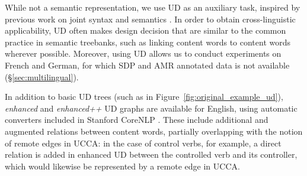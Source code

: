 \documentclass[11pt,a4paper]{article}
\begin{document}
While not a semantic representation,
we use UD as an auxiliary task,
inspired by previous work on joint syntax and semantics
\cite{lluis2008joint,collobert2011natural,D15-1169,swayamdipta-EtAl:2016:CoNLL,swayamdipta2017frame}.
In order to obtain cross-linguistic applicability, 
UD often makes design decision that are similar to the common practice
in semantic treebanks, such as linking content words to content words wherever possible.
Moreover, using UD allows us to conduct experiments on French and German, 
for which SDP and AMR annotated data is not available (\S\ref{sec:multilingual}).

In addition to basic UD trees (such as in Figure~\ref{fig:original_example_ud}),
\textit{enhanced} and \textit{enhanced++} UD graphs are available for English,
using automatic converters included in Stanford CoreNLP \cite{SCHUSTER16.779}.
These include additional and augmented relations between content words,
partially overlapping with the notion of remote edges in UCCA:
in the case of control verbs, for example, a direct relation is added in enhanced UD
between the controlled verb and its controller,
which would likewise be represented by a remote edge in UCCA.
\end{document}

